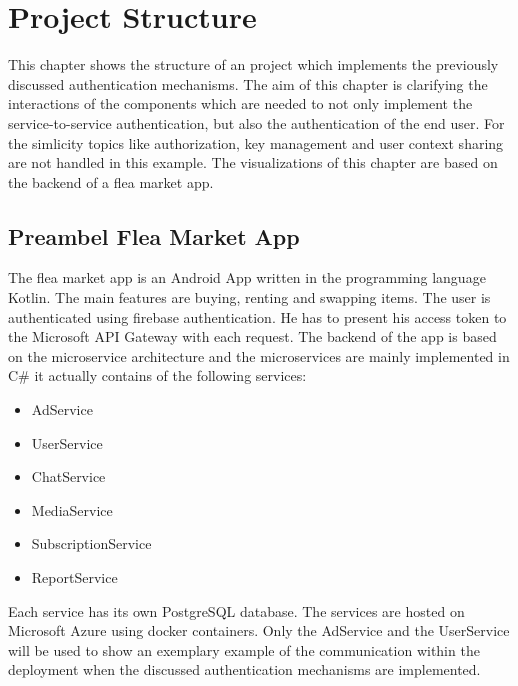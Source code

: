 \chapter{Project Structure}
\label{cha:project_structure}
This chapter shows the structure of an project which implements the previously discussed authentication mechanisms.
The aim of this chapter is clarifying the interactions of the components which are needed to not only implement the service-to-service authentication, but also the authentication of the end user.
For the simlicity topics like authorization, key management and user context sharing are not handled in this example.
The visualizations of this chapter are based on the backend of a flea market app.

\section{Preambel Flea Market App}
The flea market app is an Android App written in the programming language Kotlin.
The main features are buying, renting and swapping items.
The user is authenticated using firebase authentication.
He has to present his access token to the Microsoft API Gateway with each request.
The backend of the app is based on the microservice architecture and the microservices are mainly implemented in C\# it actually contains of the following services:
\begin{itemize}
	\item AdService
	\item UserService
	\item ChatService
	\item MediaService
	\item SubscriptionService
	\item ReportService
\end{itemize}
Each service has its own PostgreSQL database.
The services are hosted on Microsoft Azure using docker containers.
Only the AdService and the UserService will be used to show an exemplary example of the communication within the deployment when the discussed authentication mechanisms are implemented.

